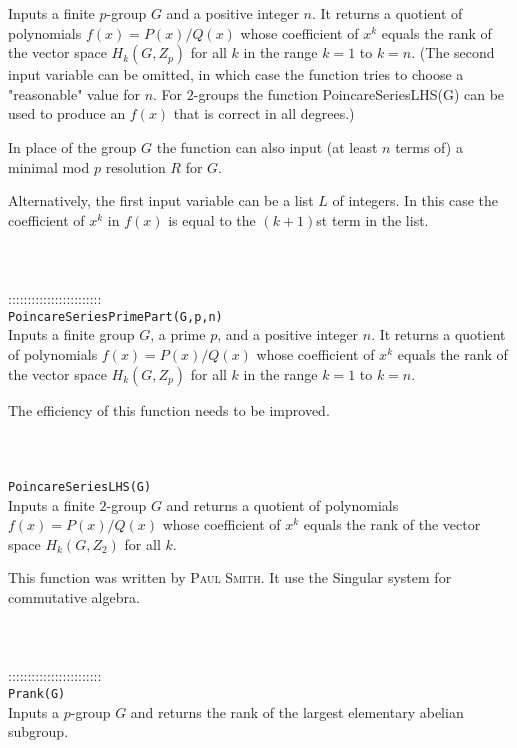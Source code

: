 \documentclass[a4paper,11pt]{report}
\begin{document}
{ Inputs a finite $p$-group $G$ and a positive integer $n$. It returns a quotient of polynomials $f(x)=P(x)/Q(x)$ whose coefficient of $x^k$ equals the rank of the vector space $H_k(G,Z_p)$ for all $k$ in the range $k=1$ to $k=n$. (The second input variable can be omitted, in which case the function tries
to choose a "reasonable" value for $n$. For $2$-groups the function PoincareSeriesLHS(G) can be used to produce an $f(x)$ that is correct in all degrees.) 

 In place of the group $G$ the function can also input (at least $n$ terms of) a minimal mod $p$ resolution $R$ for $G$. 

 Alternatively, the first input variable can be a list $L$ of integers. In this case the coefficient of $x^k$ in $f(x)$ is equal to the $(k+1)$st term in the list. \\
 \\
 \\
 \\
 ::::::::::::::::::::::::\\
 \texttt{PoincareSeriesPrimePart(G,p,n) }\\
 

 Inputs a finite group $G$, a prime $p$, and a positive integer $n$. It returns a quotient of polynomials $f(x)=P(x)/Q(x)$ whose coefficient of $x^k$ equals the rank of the vector space $H_k(G,Z_p)$ for all $k$ in the range $k=1$ to $k=n$. 

 The efficiency of this function needs to be improved. \\
 \\
 \\
 \\
 \texttt{PoincareSeriesLHS(G) }\\
 

 Inputs a finite $2$-group $G$ and returns a quotient of polynomials $f(x)=P(x)/Q(x)$ whose coefficient of $x^k$ equals the rank of the vector space $H_k(G,Z_2)$ for all $k$. 

 This function was written by \textsc{Paul Smith}. It use the Singular system for commutative algebra. \\
 \\
 \\
 \\
 ::::::::::::::::::::::::\\
 \texttt{Prank(G) }\\
 

 Inputs a $p$-group $G$ and returns the rank of the largest elementary abelian subgroup. \\
 \\
 \\
 }
\end{document}
